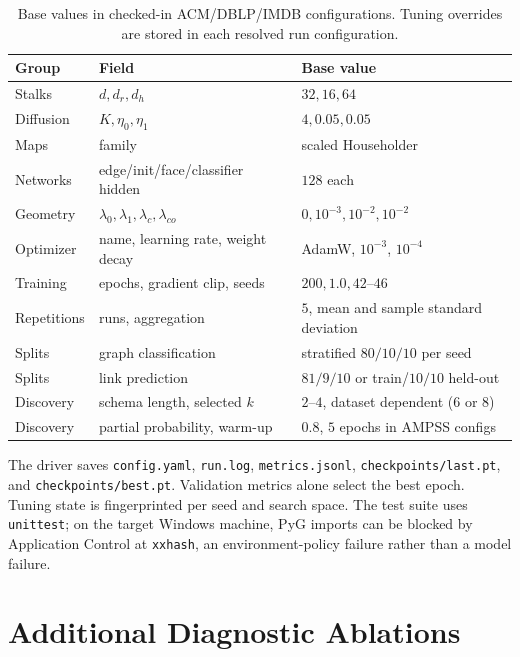 \begin{table}[h]
  \centering
  \caption{Base values in checked-in ACM/DBLP/IMDB configurations. Tuning overrides are stored in
  each resolved run configuration.}
  \small
  \begin{tabular}{lll}
    \toprule
    \textbf{Group} & \textbf{Field} & \textbf{Base value} \\
    \midrule
    Stalks & $d,d_r,d_h$ & $32,16,64$ \\
    Diffusion & $K,\eta_0,\eta_1$ & $4,0.05,0.05$ \\
    Maps & family & scaled Householder \\
    Networks & edge/init/face/classifier hidden & $128$ each \\
    Geometry & $\lambda_0,\lambda_1,\lambda_c,\lambda_{co}$ & $0,10^{-3},10^{-2},10^{-2}$ \\
    Optimizer & name, learning rate, weight decay & AdamW, $10^{-3}$, $10^{-4}$ \\
    Training & epochs, gradient clip, seeds & $200,1.0,42$--$46$ \\
    Repetitions & runs, aggregation & $5$, mean and sample standard deviation \\
    Splits & graph classification & stratified $80/10/10$ per seed \\
    Splits & link prediction & $81/9/10$ or train/$10/10$ held-out \\
    Discovery & schema length, selected $k$ & $2$--$4$, dataset dependent ($6$ or $8$) \\
    Discovery & partial probability, warm-up & $0.8$, $5$ epochs in AMPSS configs \\
    \bottomrule
  \end{tabular}
\end{table}

The driver saves \texttt{config.yaml}, \texttt{run.log}, \texttt{metrics.jsonl},
\texttt{checkpoints/last.pt}, and \texttt{checkpoints/best.pt}. Validation metrics alone select the
best epoch. Tuning state is fingerprinted per seed and search space. The test suite uses
\texttt{unittest}; on the target Windows machine, PyG imports can be blocked by Application Control
at \texttt{xxhash}, an environment-policy failure rather than a model failure.

\section{Additional Diagnostic Ablations}
\label{app:ablations}

